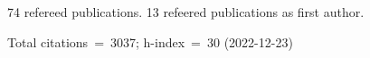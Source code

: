 74 refereed publications. 13 refeered publications as first author.

Total citations~=~3037; h-index~=~30 (2022-12-23)